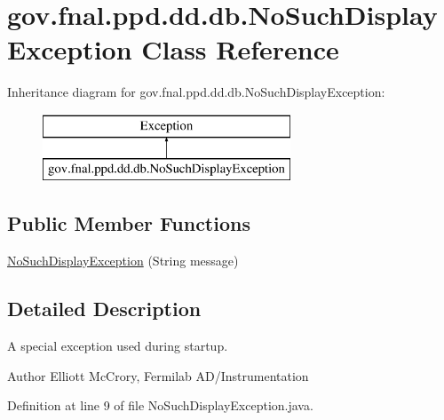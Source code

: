 \hypertarget{classgov_1_1fnal_1_1ppd_1_1dd_1_1db_1_1NoSuchDisplayException}{\section{gov.\-fnal.\-ppd.\-dd.\-db.\-No\-Such\-Display\-Exception Class Reference}
\label{classgov_1_1fnal_1_1ppd_1_1dd_1_1db_1_1NoSuchDisplayException}
}
Inheritance diagram for gov.\-fnal.\-ppd.\-dd.\-db.\-No\-Such\-Display\-Exception\-:\begin{figure}[H]
\begin{center}
\leavevmode
\includegraphics[height=2.000000cm]{classgov_1_1fnal_1_1ppd_1_1dd_1_1db_1_1NoSuchDisplayException}
\end{center}
\end{figure}
\subsection*{Public Member Functions}
\begin{DoxyCompactItemize}
\item 
\hyperlink{classgov_1_1fnal_1_1ppd_1_1dd_1_1db_1_1NoSuchDisplayException_a146774399d8da17cc34caed0f073d072}{No\-Such\-Display\-Exception} (String message)
\end{DoxyCompactItemize}


\subsection{Detailed Description}
A special exception used during startup.

\begin{DoxyAuthor}{Author}
Elliott Mc\-Crory, Fermilab A\-D/\-Instrumentation 
\end{DoxyAuthor}


Definition at line 9 of file No\-Such\-Display\-Exception.\-java.



